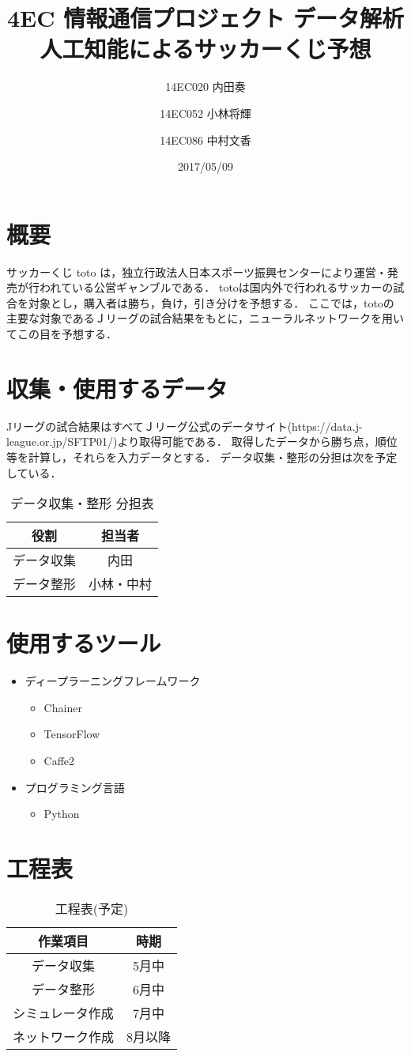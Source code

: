 \documentclass[9pt]{jsarticle}
\title{4EC 情報通信プロジェクト データ解析\\ 人工知能によるサッカーくじ予想}
\date{2017/05/09}
\author{14EC020 内田奏 \and 14EC052 小林将輝 \and 14EC086 中村文香}
\begin{document}
\maketitle
\thispagestyle{fancy}
\section{概要}
サッカーくじ toto は，独立行政法人日本スポーツ振興センターにより運営・発売が行われている公営ギャンブルである．
totoは国内外で行われるサッカーの試合を対象とし，購入者は勝ち，負け，引き分けを予想する．
ここでは，totoの主要な対象であるＪリーグの試合結果をもとに，ニューラルネットワークを用いてこの目を予想する．

\section{収集・使用するデータ}
Jリーグの試合結果はすべてＪリーグ公式のデータサイト(https://data.j-league.or.jp/SFTP01/)より取得可能である．
取得したデータから勝ち点，順位等を計算し，それらを入力データとする．
データ収集・整形の分担は次を予定している．
\begin{table}[htbp]
\centering
\caption{データ収集・整形 分担表} \label{Equipments}
\begin{tabular}{cc} 
\hline
役割&担当者\\\hline\hline
データ収集&内田\\
データ整形&小林・中村\\\hline
\end{tabular}
\end{table}

\section{使用するツール}
\begin{itemize}
\item{ディープラーニングフレームワーク}
\begin{itemize}
\item{Chainer}
\item{TensorFlow}
\item{Caffe2}
\end{itemize}
\item{プログラミング言語}
\begin{itemize}
\item{Python}
\end{itemize}
\end{itemize}

\section{工程表}
\begin{table}[htbp]
\centering
\caption{工程表(予定)} \label{Equipments}
\begin{tabular}{cc} 
\hline
作業項目&時期\\\hline\hline
データ収集&5月中\\
データ整形&6月中\\
シミュレータ作成&7月中\\
ネットワーク作成&8月以降\\\hline
\end{tabular}
\end{table}
\end{document}
